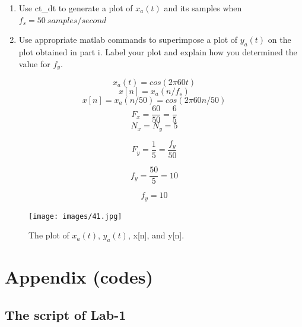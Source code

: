 \documentclass[12pt]{article}
\begin{document}
\begin{enumerate}
\begin{enumerate}
\begin{enumerate}
\item Use ct\_dt to generate a plot of $x_a(t)$ and its samples when $f_s = 50\ samples/second$
\item Use appropriate matlab commands to superimpose a plot of $y_a(t)$ on the plot obtained in part i. Label your plot and explain how you determined the value for
$f_y$.
\end{enumerate}
$$x_a(t) = cos(2\pi60t)$$
$$x[n] = x_a(n/f_s)$$
$$x[n] = x_a(n/50) = cos(2\pi60n/50)$$
$$F_x = \frac{60}{50} = \frac{6}{5}$$
$$N_x = N_y = 5$$

$$F_y = \frac{1}{5} = \frac{f_y}{50}$$

$$f_y = \frac{50}{5} = 10$$


$$\boxed{f_y = 10}$$


\begin{figure}[H]
    \centering
    \begin{minipage}[b]{0.7\textwidth}
        \texttt{[image: images/41.jpg]}
    \end{minipage}
    \caption{The plot of $x_a(t)$, $y_a(t)$, x[n], and y[n].}
    \label{fig:41}
\end{figure}

\end{enumerate}
\end{enumerate}






\newpage
\section{Appendix (codes)}
\subsection{The script of Lab-1}
\end{document}
